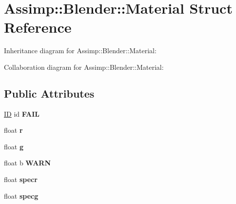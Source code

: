 \hypertarget{struct_assimp_1_1_blender_1_1_material}{\section{Assimp\+:\+:Blender\+:\+:Material Struct Reference}
\label{struct_assimp_1_1_blender_1_1_material}
}


Inheritance diagram for Assimp\+:\+:Blender\+:\+:Material\+:


Collaboration diagram for Assimp\+:\+:Blender\+:\+:Material\+:
\subsection*{Public Attributes}
\begin{DoxyCompactItemize}
\item 
\hypertarget{struct_assimp_1_1_blender_1_1_material_a6cad00e1da97112ec00e2fea4b046f07}{\hyperlink{struct_assimp_1_1_blender_1_1_i_d}{I\+D} id {\bfseries F\+A\+I\+L}}\label{struct_assimp_1_1_blender_1_1_material_a6cad00e1da97112ec00e2fea4b046f07}

\item 
\hypertarget{struct_assimp_1_1_blender_1_1_material_a4b918c7e48dc30cfa3672d7025c0e4ca}{float {\bfseries r}}\label{struct_assimp_1_1_blender_1_1_material_a4b918c7e48dc30cfa3672d7025c0e4ca}

\item 
\hypertarget{struct_assimp_1_1_blender_1_1_material_a0d576ad40f65667f9d3297b4591cac65}{float {\bfseries g}}\label{struct_assimp_1_1_blender_1_1_material_a0d576ad40f65667f9d3297b4591cac65}

\item 
\hypertarget{struct_assimp_1_1_blender_1_1_material_a9c56bb94f4d4e6071c5b855c98893b3d}{float b {\bfseries W\+A\+R\+N}}\label{struct_assimp_1_1_blender_1_1_material_a9c56bb94f4d4e6071c5b855c98893b3d}

\item 
\hypertarget{struct_assimp_1_1_blender_1_1_material_a2b5c1163fec58dd07a1cd3cc5dfff215}{float {\bfseries specr}}\label{struct_assimp_1_1_blender_1_1_material_a2b5c1163fec58dd07a1cd3cc5dfff215}

\item 
\hypertarget{struct_assimp_1_1_blender_1_1_material_a0969c41571e3ac192517693655110621}{float {\bfseries specg}}\label{struct_assimp_1_1_blender_1_1_material_a0969c41571e3ac192517693655110621}


\end{DoxyCompactItemize}
